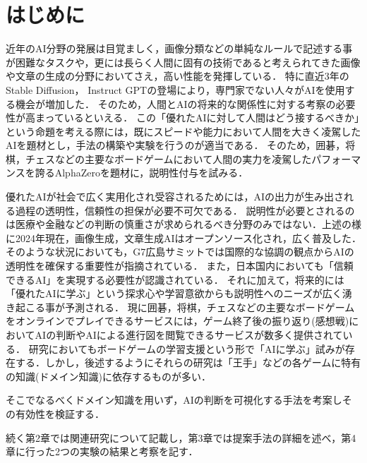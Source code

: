 \chapter{はじめに}
近年のAI分野の発展は目覚ましく，画像分類などの単純なルールで記述する事が困難なタスクや，更には長らく人間に固有の技術であると考えられてきた画像や文章の生成の分野においてさえ，高い性能を発揮している\cite{cat}．
特に直近3年のStable Diffusion\cite{diffusion}， Instruct GPT\cite{GPT}の登場により，専門家でない人々がAIを使用する機会が増加した．
そのため，人間とAIの将来的な関係性に対する考察の必要性が高まっているといえる．
この「優れたAIに対して人間はどう接するべきか」という命題を考える際には，既にスピードや能力において人間を大きく凌駕したAIを題材とし，手法の構築や実験を行うのが適当である．
そのため，囲碁，将棋，チェスなどの主要なボードゲームにおいて人間の実力を凌駕したパフォーマンスを誇るAlphaZeroを題材に，説明性付与を試みる．

優れたAIが社会で広く実用化され受容されるためには，AIの出力が生み出される過程の透明性，信頼性の担保が必要不可欠である．
説明性が必要とされるのは医療や金融などの判断の慎重さが求められるべき分野のみではない．上述の様に2024年現在，画像生成，文章生成AIはオープンソース化され，広く普及した．
そのような状況においても，G7広島サミットでは国際的な協調の観点からAIの透明性を確保する重要性が指摘されている\cite{Hiroshima}．
また，日本国内においても「信頼できるAI」を実現する必要性が認識されている\cite{グランドデザイン}．
それに加えて，将来的には「優れたAIに学ぶ」という探求心や学習意欲からも説明性へのニーズが広く湧き起こる事が予測される．
現に囲碁，将棋，チェスなどの主要なボードゲームをオンラインでプレイできるサービスには，ゲーム終了後の振り返り(感想戦)においてAIの判断やAIによる進行図を閲覧できるサービスが数多く提供されている\cite{panda}\cite{wars}．
研究においてもボードゲームの学習支援という形で「AIに学ぶ」試みが存在する．しかし，後述するようにそれらの研究は「王手」などの各ゲームに特有の知識(ドメイン知識)に依存するものが多い．

そこでなるべくドメイン知識を用いず，AIの判断を可視化する手法を考案しその有効性を検証する．

続く第2章では関連研究について記載し，第3章では提案手法の詳細を述べ，第4章に行った2つの実験の結果と考察を記す．

